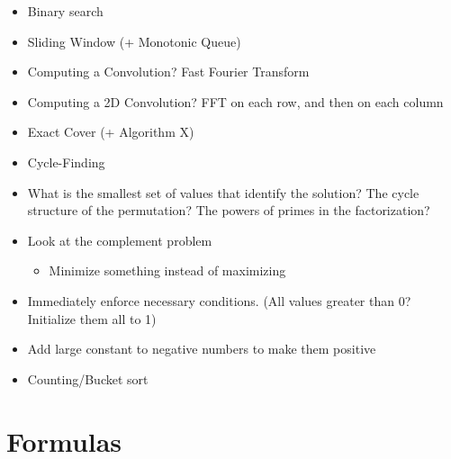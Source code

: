 \documentclass[8pt,a4paper,landscape,oneside]{amsart}
\newenvironment{myitemize}
{ \begin{itemize}[leftmargin=.5cm]
    \setlength{\itemsep}{0pt}
    \setlength{\parskip}{0pt}
    \setlength{\parsep}{0pt}     }
{ \end{itemize}                  }
\begin{document}
\begin{multicols*}{3}
\begin{myitemize}
                \item Binary search
                \item Sliding Window (+ Monotonic Queue)
                \item Computing a Convolution? Fast Fourier Transform
                \item Computing a 2D Convolution? FFT on each row, and then on each column
                \item Exact Cover (+ Algorithm X)
                \item Cycle-Finding
                \item What is the smallest set of values that identify the solution? The cycle structure of the permutation? The powers of primes in the factorization?
                \item Look at the complement problem
                    \begin{itemize}
                        \item Minimize something instead of maximizing
                    \end{itemize}
                \item Immediately enforce necessary conditions. (All values greater than 0? Initialize them all to 1)
                \item Add large constant to negative numbers to make them positive
                \item Counting/Bucket sort
            \end{myitemize}

    \section{Formulas}




\end{multicols*}
\end{document}

